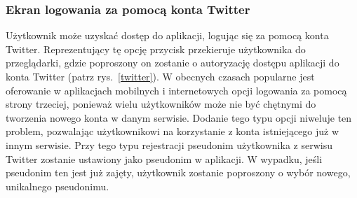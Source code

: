         \subsubsection{Ekran logowania za pomocą konta Twitter}
        Użytkownik może uzyskać dostęp do aplikacji, logując się za pomocą konta Twitter. Reprezentujący tę opcję przycisk przekieruje użytkownika do przeglądarki, gdzie poproszony on zostanie o autoryzację
        dostępu aplikacji do konta Twitter (patrz rys.~\ref{twitter}). W obecnych czasach popularne jest oferowanie w aplikacjach mobilnych i internetowych opcji logowania za pomocą strony trzeciej, ponieważ
        wielu użytkowników może nie być chętnymi do tworzenia nowego konta w danym serwisie. Dodanie tego typu opcji niweluje ten problem, pozwalając użytkownikowi na korzystanie z konta istniejącego już w
        innym serwisie. Przy tego typu rejestracji pseudonim użytkownika z serwisu Twitter zostanie ustawiony jako pseudonim w aplikacji. W wypadku, jeśli pseudonim ten jest już zajęty, użytkownik zostanie
        poproszony o wybór nowego, unikalnego pseudonimu.

